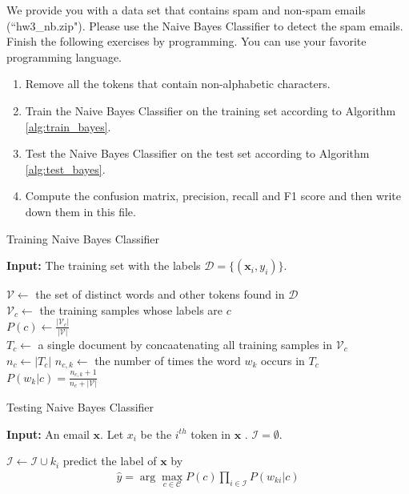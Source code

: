 \documentclass[11pt,letter,notitlepage]{article}
\begin{document}
\newpage
\begin{exercise}
	We provide you with a data set that contains spam and non-spam emails (``hw3\_nb.zip"). Please use the Naive Bayes Classifier to detect the spam emails.
	Finish the following exercises by programming. You can use your favorite programming language.
	\begin{enumerate}
		\item Remove all the tokens that contain non-alphabetic characters.
		\item Train the Naive Bayes Classifier on the training set according to Algorithm \ref{alg:train_bayes}.
		\item Test the Naive Bayes Classifier on the test set according to Algorithm \ref{alg:test_bayes}.
		\item Compute the confusion matrix, precision, recall and F1 score and then write down them in this file.
	\end{enumerate}

\end{exercise}

\begin{algorithm}
	\caption{Training Naive Bayes Classifier}
	\label{alg:train_bayes}
	\textbf{Input:} The training set with the labels $\mathcal{D}=\{(\textbf{x}_i,y_i)\}.$
	\begin{algorithmic}[1]
		\STATE $\mathcal{V}\leftarrow$ the set of distinct words and other tokens found in $\mathcal{D}$\\
		\STATE $\mathcal{V}_c\leftarrow$ the training samples whose labels are $c$\\
		\STATE $P(c)\leftarrow\frac{|\mathcal{V}_c|}{|\mathcal{V}|}$\\
		\STATE $T_c\leftarrow$ a single document by concaatenating all training samples in $\mathcal{V}_c$\\
		\STATE $n_c\leftarrow |T_c|$
		\STATE $n_{c,k}\leftarrow$ the number of times the word $w_k$ occurs in $T_c$\\
		\STATE $P(w_k|c)=\frac{n_{c,k}+1}{n_c+|\mathcal{V}|}$
		\ENDFOR
		\ENDFOR
	\end{algorithmic}
\end{algorithm}

\begin{algorithm}
	\caption{Testing Naive Bayes Classifier }
	\label{alg:test_bayes}
	\textbf{Input:} An email $\textbf{x}$. Let $x_i$ be the $i^{th}$ token in $\textbf{x}$ . $\mathcal{I}=\emptyset.$
	\begin{algorithmic}[1]
		\STATE $\mathcal{I}\leftarrow\mathcal{I}\cup k_i$
		\ENDIF
		\ENDFOR
		\STATE predict the label of $\textbf{x}$ by
		\begin{align*}
			\hat{y}=\arg\max_{c\in\mathcal{C}} P(c)\prod_{i\in\mathcal{I}}P(w_{ki}|c)
		\end{align*}
	\end{algorithmic}
\end{algorithm}
\end{document}
